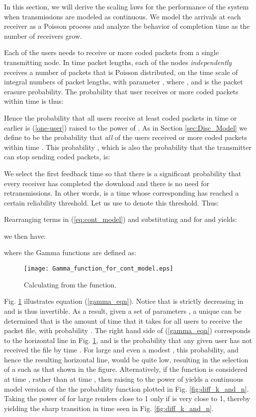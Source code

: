 In this section, we will derive the scaling laws for the performance of the system when transmissions are modeled as continuous. We model the arrivals at each receiver as a Poisson process and analyze the behavior of completion time as the number of receivers  grow.

Each of the  users needs to receive  or more coded packets from a single transmitting node. In time  packet lengths, each of the  nodes \textit{independently} receives a number of packets that is Poisson distributed, on the time scale of integral numbers of packet lengths, with parameter , where , and  is the packet erasure probability. The probability that user  receives  or more coded packets within time  is thus:


Hence the probability that all  users receive at least  coded packets in time  or earlier is (\ref{one-user}) raised to the power of . As in Section \ref{sec:Disc_Model} we define  to be the probability that \textit{all} of the  users received  or more coded packets within time . This probability , which is also the probability that the transmitter can stop sending coded packets, is:


We select the first feedback time so that there is a significant probability that every receiver has completed the download and there is no need for retransmissions. In other words,  is a time whose corresponding  has reached a certain reliability threshold. Let us use  to denote this threshold. Thus: 


Rearranging terms in (\ref{eq:cont_model}) and substituting  and  for  and  yields:


we then have:

where the Gamma functions are defined as:


\begin{figure} [ht]
\centering
\texttt{[image: Gamma\_function\_for\_cont\_model.eps]}
\caption{Calculating  from the  function.}
\label{fig:Gamma_function_for_cont_model}
\end{figure}
Fig. \ref{fig:Gamma_function_for_cont_model} illustrates equation (\ref{gamma_eqn}). Notice that  is strictly decreasing in  and is thus invertible. As a result, given a set of parameters , a unique  can be determined that is the amount of time that it takes for all  users to receive the  packet file, with probability . The right hand side of (\ref{gamma_eqn}) corresponds to the horizontal line in Fig. \ref{fig:Gamma_function_for_cont_model}, and is the probability that any given user has not received the file by time . For large  and even a modest , this probability, and hence the resulting horizontal line, would be quite low, resulting in the selection of a  such as that shown in the figure. Alternatively, if the function  is considered at time , rather than at time , then raising  to the power of  yields a continuous model version of the the probability function  plotted in Fig. \ref{fig:diff_k_and_n}. Taking the  power of  for large  renders  close to 1 only if  is very close to 1, thereby yielding the sharp transition in time seen in Fig. \ref{fig:diff_k_and_n}.

